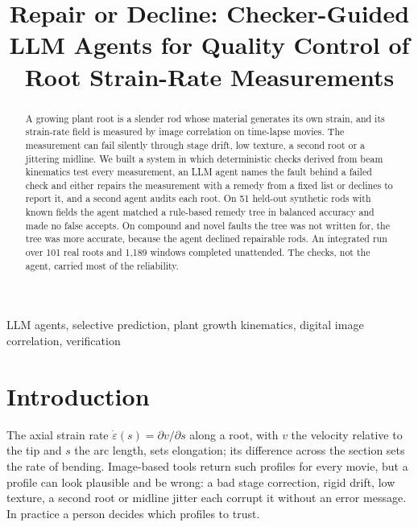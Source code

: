 \documentclass[conference]{IEEEtran}
\begin{document}
\title{Repair or Decline: Checker-Guided LLM Agents for Quality Control of Root Strain-Rate Measurements}

\author{
}

\maketitle

\begin{abstract}
A growing plant root is a slender rod whose material generates its own strain, and its strain-rate field is measured by image correlation on time-lapse movies. The measurement can fail silently through stage drift, low texture, a second root or a jittering midline. We built a system in which deterministic checks derived from beam kinematics test every measurement, an LLM agent names the fault behind a failed check and either repairs the measurement with a remedy from a fixed list or declines to report it, and a second agent audits each root. On 51 held-out synthetic rods with known fields the agent matched a rule-based remedy tree in balanced accuracy and made no false accepts. On compound and novel faults the tree was not written for, the tree was more accurate, because the agent declined repairable rods. An integrated run over 101 real roots and 1,189 windows completed unattended. The checks, not the agent, carried most of the reliability.
\end{abstract}

\begin{IEEEkeywords}
LLM agents, selective prediction, plant growth kinematics, digital image correlation, verification
\end{IEEEkeywords}

\section{Introduction}
The axial strain rate $\dot\varepsilon(s)=\partial v/\partial s$ along a root, with $v$ the velocity relative to the tip and $s$ the arc length, sets elongation; its difference across the section sets the rate of bending. Image-based tools return such profiles for every movie, but a profile can look plausible and be wrong: a bad stage correction, rigid drift, low texture, a second root or midline jitter each corrupt it without an error message. In practice a person decides which profiles to trust.
\end{document}
